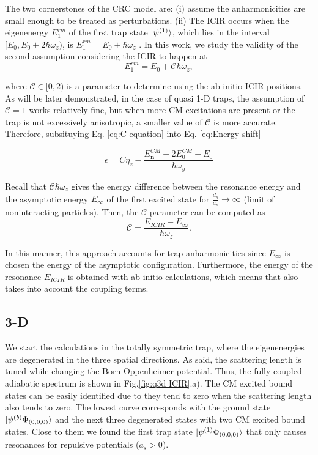 \documentclass[aps,pre,twocolumn,superscriptaddress,showpacs]{revtex4-1}
\newcommand{\bfeq}[1]{{\boldsymbol{#1}}}
\begin{document}
The two cornerstones of the CRC model are: (i) assume the anharmonicities are small enough to be treated as perturbations. (ii) The ICIR occurs when the eigenenergy $E^{rm}_1$
of the first trap state $\ket{\psi^{(1)}}$, which lies in the interval $[E_0, E_0 + 2\hbar \omega_z)$, is $E^{rm}_1 = E_0 + \hbar \omega_z$ \cite{PhysRevLett.109.073201}. In this work, we study 
the validity of the second assumption considering the ICIR to happen at
\begin{equation}
E^{rm}_1 = E_0 + \mathcal{C} \hbar \omega_z,
\label{eq:C equation}
\end{equation}
	
where $\mathcal{C} \in [0, 2)$ is a parameter to determine using the ab initio ICIR positions. As will be later demonstrated, in the case of quasi 1-D traps, the assumption of $\mathcal{C}=1$
works relatively fine, but when more CM excitations are present or the trap is not excessively anisotropic, a smaller value of $\mathcal{C}$ is more accurate. Therefore, subsituying Eq. \ref{eq:C equation} into Eq. \ref{eq:Energy shift}

\begin{equation}
\epsilon = C\eta_z - \frac{E^{CM}_{\bfeq{n}} - 2E^{CM}_0 + E_0}{\hbar \omega_y}
\label{eq:final energy shift}
\end{equation}
	
Recall that $\mathcal{C} \hbar \omega_z$ gives the energy difference between the resonance energy and the asymptotic energy $E_{\infty}$ of the first excited state for $\frac{d_y}{a_s} \to \infty$
(limit of noninteracting particles). Then, the $\mathcal{C}$ parameter can be computed as
\begin{equation}
\mathcal{C} = \frac{E_{ICIR} - E_{\infty}}{\hbar \omega_z}.
\end{equation}
	
In this manner, this approach accounts for trap anharmonicities since $E_{\infty}$ is chosen the energy of the asymptotic configuration. Furthermore, the energy of the resonance $E_{ICIR}$ is 
obtained with ab initio calculations, which means that also takes into account the coupling terms.    

\subsection{3-D} \label{subsec:3D}
We start the calculations in the totally symmetric trap, where the eigenenergies are degenerated in the three spatial directions. As said, the scattering length is tuned while changing the Born-Oppenheimer potential. Thus, the fully coupled-adiabatic spectrum is shown in Fig.\ref{fig:q3d ICIR}.a). The CM excited bound states can be easily identified due to they tend to zero when the scattering length also tends to zero. The lowest curve corresponds with the ground state $\ket{ \psi^{(b)} \Phi_{(0,0,0)} }$ and the next three degenerated states with two CM excited bound states. Close to them we found the first trap state $\ket{ \psi^{(1)} \Phi_{(0,0,0)}} $ that only causes resonances for repulsive potentials ($a_s > 0$). 
\end{document}
